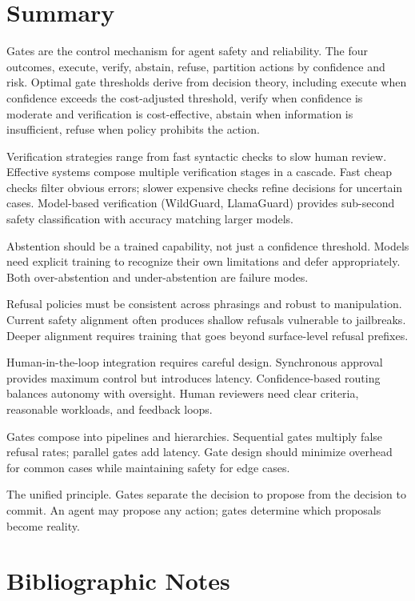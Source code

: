 \section{Summary}

Gates are the control mechanism for agent safety and reliability. The four outcomes, execute, verify, abstain, refuse, partition actions by confidence and risk. Optimal gate thresholds derive from decision theory, including execute when confidence exceeds the cost-adjusted threshold, verify when confidence is moderate and verification is cost-effective, abstain when information is insufficient, refuse when policy prohibits the action.

Verification strategies range from fast syntactic checks to slow human review. Effective systems compose multiple verification stages in a cascade. Fast cheap checks filter obvious errors; slower expensive checks refine decisions for uncertain cases. Model-based verification (WildGuard, LlamaGuard) provides sub-second safety classification with accuracy matching larger models.

Abstention should be a trained capability, not just a confidence threshold. Models need explicit training to recognize their own limitations and defer appropriately. Both over-abstention and under-abstention are failure modes.

Refusal policies must be consistent across phrasings and robust to manipulation. Current safety alignment often produces shallow refusals vulnerable to jailbreaks. Deeper alignment requires training that goes beyond surface-level refusal prefixes.

Human-in-the-loop integration requires careful design. Synchronous approval provides maximum control but introduces latency. Confidence-based routing balances autonomy with oversight. Human reviewers need clear criteria, reasonable workloads, and feedback loops.

Gates compose into pipelines and hierarchies. Sequential gates multiply false refusal rates; parallel gates add latency. Gate design should minimize overhead for common cases while maintaining safety for edge cases.

The unified principle. Gates separate the decision to propose from the decision to commit. An agent may propose any action; gates determine which proposals become reality.

\section*{Bibliographic Notes}

